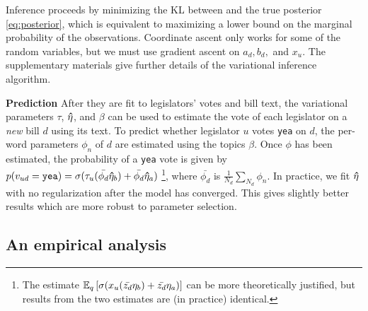 Inference proceeds by minimizing the KL between  and
the true posterior \ref{eq:posterior}, which is equivalent to
maximizing a lower bound on the marginal probability of the
observations.  Coordinate ascent only works for some of the random
variables, but we must use gradient ascent on $a_d, b_d,$ and $x_u$.
The supplementary materials give further details of the variational
inference algorithm.

\textbf{Prediction} After they are fit to legislators' votes and bill
text, the variational parameters $\tau$, $\bm \hat \eta$, and $\beta$ can be
used to estimate the vote of each legislator on a \emph{new} bill $d$
using its text.  To predict whether legislator $u$ votes \verb!yea! on
$d$, the per-word parameters $\phi_n$ of $d$ are estimated using the
topics $\beta$. Once $\phi$ has been estimated, the probability of a
\verb!yea! vote is given by $p(v_{ud} = \verb!yea!)  = \sigma(\tau_u
(\bar{\phi_d} \ev_b) + \bar{\phi_d} \ev_a)$
\footnote{The estimate $\mathbb{E}_q\left[\sigma(x_u (\bar{z_d} \eta_b) +
    \bar{z_d} \eta_a)\right]$ can be more theoretically justified, but
  results from the two estimates are (in practice) identical.}, where
$\bar{\phi_d}$ is $\frac{1}{N_d} \sum_{N_d} \phi_n$.  In practice, we
fit $\bm \hat \eta$ with no regularization after the model has converged.  This
gives slightly better results which are more robust to parameter
selection.

\subsection*{An empirical analysis}


